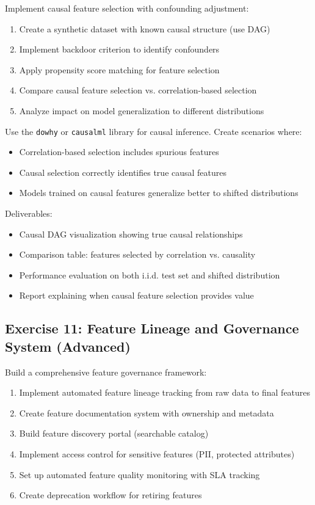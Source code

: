 Implement causal feature selection with confounding adjustment:

\begin{enumerate}
    \item Create a synthetic dataset with known causal structure (use DAG)
    \item Implement backdoor criterion to identify confounders
    \item Apply propensity score matching for feature selection
    \item Compare causal feature selection vs. correlation-based selection
    \item Analyze impact on model generalization to different distributions
\end{enumerate}

Use the \texttt{dowhy} or \texttt{causalml} library for causal inference. Create scenarios where:
\begin{itemize}
    \item Correlation-based selection includes spurious features
    \item Causal selection correctly identifies true causal features
    \item Models trained on causal features generalize better to shifted distributions
\end{itemize}

Deliverables:
\begin{itemize}
    \item Causal DAG visualization showing true causal relationships
    \item Comparison table: features selected by correlation vs. causality
    \item Performance evaluation on both i.i.d. test set and shifted distribution
    \item Report explaining when causal feature selection provides value
\end{itemize}

\subsection{Exercise 11: Feature Lineage and Governance System (Advanced)}

Build a comprehensive feature governance framework:

\begin{enumerate}
    \item Implement automated feature lineage tracking from raw data to final features
    \item Create feature documentation system with ownership and metadata
    \item Build feature discovery portal (searchable catalog)
    \item Implement access control for sensitive features (PII, protected attributes)
    \item Set up automated feature quality monitoring with SLA tracking
    \item Create deprecation workflow for retiring features
\end{enumerate}

